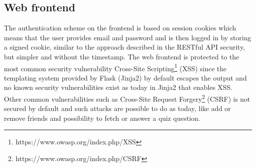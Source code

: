 \subsection{Web frontend}
The authentication scheme on the frontend is based on session cookies which means that the user provides email and password and is then logged in by storing a signed cookie, similar to the approach described in the RESTful API security, but simpler and without the timestamp. The web frontend is protected to the most common security vulnerability Cross-Site Scripting\footnote{https://www.owasp.org/index.php/XSS} (XSS) since the templating system provided by Flask (Jinja2) by default escapes the output and no known security vulnerabilities exist as today in Jinja2 that enables XSS. Other common vulnerabilities such as Cross-Site Request Forgery\footnote{https://www.owasp.org/index.php/CSRF} (CSRF) is not secured by default and such attacks are possible to do as today, like add or remove friends and possibility to fetch or answer a quiz question.
